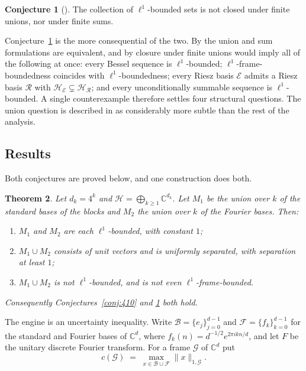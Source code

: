 \documentclass[11pt,reqno]{amsart}
\theoremstyle{plain}
\newtheorem{theorem}{Theorem}[section]
\theoremstyle{definition}
\newtheorem{conjecture}[theorem]{Conjecture}
\theoremstyle{remark}
\newcommand{\C}{\mathbb{C}}
\newcommand{\HH}{\mathcal{H}}
\begin{document}
\begin{conjecture}[{\cite[Conj.~4.13]{HeilYu}}]\label{conj:413}
The collection of $\ell^1$-bounded sets is not closed under finite
unions, nor under finite sums.
\end{conjecture}

Conjecture~\ref{conj:413} is the more consequential of the two.  By
\cite[Lem.~4.11]{HeilYu} the union and sum formulations are equivalent,
and by \cite[Thm.~4.12]{HeilYu} closure under finite unions would imply
all of the following at once: every Bessel sequence is
$\ell^1$-bounded; $\ell^1$-frame-boundedness coincides with
$\ell^1$-boundedness; every Riesz basis $\mathcal{E}$ admits a Riesz
basis $\mathcal{R}$ with
$\HH_{\mathcal{E}}\subsetneq\HH_{\mathcal{R}}$; and every
unconditionally summable sequence is $\ell^1$-bounded.  A single
counterexample therefore settles four structural questions.  The union
question is described in \cite{HeilYu} as considerably more subtle than
the rest of the analysis.

\subsection{Results}

Both conjectures are proved below, and one construction does both.

\begin{theorem}\label{thm:main}
Let $d_k=4^k$ and $\HH=\bigoplus_{k\ge1}\C^{d_k}$.  Let $M_1$ be the
union over $k$ of the standard bases of the blocks and $M_2$ the union
over $k$ of the Fourier bases.  Then\textup:
\begin{enumerate}
\item[\textup{(i)}] $M_1$ and $M_2$ are each $\ell^1$-bounded, with
constant $1$\textup;
\item[\textup{(ii)}] $M_1\cup M_2$ consists of unit vectors and is
uniformly separated, with separation at least $1$\textup;
\item[\textup{(iii)}] $M_1\cup M_2$ is not $\ell^1$-bounded, and is not
even $\ell^1$-frame-bounded.
\end{enumerate}
Consequently Conjectures~\textup{\ref{conj:410}} and
\textup{\ref{conj:413}} both hold.
\end{theorem}

The engine is an uncertainty inequality.  Write
$\mathcal{B}=\{e_j\}_{j=0}^{d-1}$ and $\mathcal{F}=\{f_k\}_{k=0}^{d-1}$
for the standard and Fourier bases of $\C^d$, where
$f_k(n)=d^{-1/2}e^{2\pi ikn/d}$, and let $F$ be the unitary discrete
Fourier transform.  For a frame $\mathcal{G}$ of $\C^d$ put
\[
  c(\mathcal{G})\;=\;\max_{x\in\mathcal{B}\cup\mathcal{F}}
  \|x\|_{1,\mathcal{G}}.
\]
\end{document}
